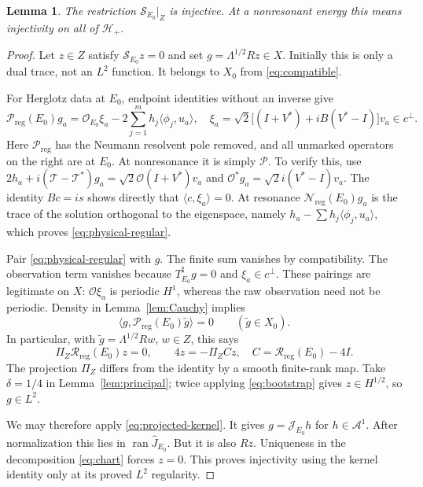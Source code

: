 \documentclass[11pt]{amsart}
\numberwithin{equation}{section}
\newtheorem{lemma}{Lemma}[section]
\newcommand{\OO}{\mathcal O}
\newcommand{\TT}{\mathcal T}
\newcommand{\NN}{\mathcal N}
\newcommand{\PP}{\mathcal P}
\newcommand{\JJ}{\mathcal J}
\newcommand{\ran}{\operatorname{ran}}
\newcommand{\ip}[2]{\langle #1,#2\rangle}
\begin{document}
\begin{lemma}\label{lem:injective-reduced}
The restriction $\mathscr S_{E_0}|_Z$ is injective. At a nonresonant energy
this means injectivity on all of $\mathcal H_+$.
\end{lemma}
\begin{proof}
Let $z\in Z$ satisfy $\mathscr S_{E_0}z=0$ and set
$g=\Lambda^{1/2}Rz\in X$. Initially this is only a dual trace, not an
$L^2$ function. It belongs to $X_0$ from \eqref{eq:compatible}.

For Herglotz data at $E_0$, endpoint identities without an inverse give
\begin{equation}\label{eq:physical-regular}
 \PP_{\mathrm{reg}}(E_0)g_a
   =\OO_{E_0}\xi_a-2\sum_{j=1}^m h_j\ip{\phi_j}{u_a},
 \quad
 \xi_a=\sqrt2\bigl[(I+V^*)+iB(V^*-I)\bigr]v_a\in c^\perp.
\end{equation}
Here $\PP_{\mathrm{reg}}$ has the Neumann resolvent pole removed, and all unmarked
operators on the right are at $E_0$. At nonresonance it is simply $\PP$.
To verify this, use
$2h_a+i(\TT-\TT^*)g_a=\sqrt2\OO(I+V^*)v_a$ and
$\OO^*g_a=\sqrt2 i(V^*-I)v_a$. The identity $Bc=is$ shows directly that
$\ip c{\xi_a}=0$. At resonance $\NN_{\mathrm{reg}}(E_0)g_a$ is the trace
of the solution orthogonal to the eigenspace, namely
$h_a-\sum h_j\ip{\phi_j}{u_a}$, which proves \eqref{eq:physical-regular}.

Pair \eqref{eq:physical-regular} with $g$. The finite sum vanishes by
compatibility. The observation term vanishes because
$T_{E_0}^\sharp g=0$ and $\xi_a\in c^\perp$.
These pairings are legitimate on $X$: $\OO\xi_a$ is periodic $H^1$,
whereas the raw observation need not be periodic. Density in
Lemma~\ref{lem:Cauchy} implies
\[
 \ip g{\PP_{\mathrm{reg}}(E_0)\widetilde g}=0
                       \qquad(\widetilde g\in X_0).
\]
In particular, with $\widetilde g=\Lambda^{1/2}Rw$, $w\in Z$, this says
\begin{equation}\label{eq:bootstrap}
 \Pi_Z\mathscr R_{\mathrm{reg}}(E_0)z=0,
 \qquad 4z=-\Pi_Z C z,
 \quad C=\mathscr R_{\mathrm{reg}}(E_0)-4I.
\end{equation}
The projection $\Pi_Z$ differs from the identity by a smooth finite-rank
map. Take $\delta=1/4$ in Lemma~\ref{lem:principal}; twice applying
\eqref{eq:bootstrap} gives $z\in H^{1/2}$, so $g\in L^2$.

We may therefore apply \eqref{eq:projected-kernel}. It gives
$g=\JJ_{E_0}h$ for $h\in\mathscr A^1$. After normalization this lies in
$\ran\widehat J_{E_0}$. But it is also $Rz$. Uniqueness in the decomposition
\eqref{eq:chart} forces $z=0$. This proves injectivity using the kernel identity only at its proved $L^2$ regularity.
\end{proof}
\end{document}

